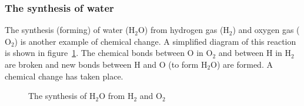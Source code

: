 \subsubsection*{The synthesis of water}
\label{m38709*id62788}The synthesis (forming) of water ($\text{H}_{2}\text{O}$) from hydrogen gas ($\text{H}_{2}$) and oxygen gas ($\text{O}_{2}$) is another example of chemical change. A simplified diagram of this reaction is shown in figure~\ref{fig:chemical change:synthesis}. The chemical bonds between $\text{O}$ in $\text{O}_{2}$ and between $\text{H}$ in $\text{H}_{2}$ are broken and new bonds between $\text{H}$ and $\text{O}$ (to form $\text{H}_{2}\text{O}$) are formed. A chemical change has taken place.
    \setcounter{subfigure}{0}
\begin{figure}[H]
\begin{center}
\end{center}
\caption{The synthesis of $\text{H}_{2}\text{O}$ from $\text{H}_{2}$ and $\text{O}_{2}$}
\label{fig:chemical change:synthesis}
\end{figure} 
\label{m38709*secfhsst!!!underscore!!!id163}
